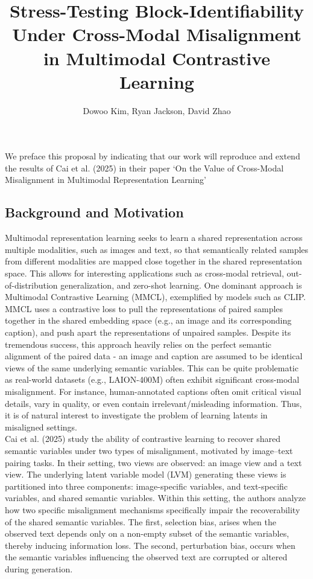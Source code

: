 \documentclass[a4paper,12pt]{article}
\title{Stress-Testing Block-Identifiability Under Cross-Modal Misalignment in Multimodal Contrastive Learning}
\author{Dowoo Kim, Ryan Jackson, David Zhao}
\begin{document}
\maketitle
We preface this proposal by indicating that our work will reproduce and extend the results of Cai et al. (2025) in their paper ‘On the Value of Cross-Modal Misalignment in Multimodal Representation Learning’ \cite{cai2025valuecrossmodalmisalignmentmultimodal}

\subsection*{Background and Motivation}

Multimodal representation learning seeks to learn a shared representation across multiple modalities, such as images and text, so that semantically related samples from different modalities are mapped close together in the shared representation space. This allows for interesting applications such as cross-modal retrieval, out-of-distribution generalization, and zero-shot learning. One dominant approach is Multimodal Contrastive Learning (MMCL), exemplified by models such as CLIP. MMCL uses a contrastive loss to pull the representations of paired samples together in the shared embedding space (e.g., an image and its corresponding caption), and push apart the representations of unpaired samples. Despite its tremendous success, this approach heavily relies on the perfect semantic alignment of the paired data - an image and caption are assumed to be identical views of the same underlying semantic variables. This can be quite problematic as real-world datasets (e.g., LAION-400M) often exhibit significant cross-modal misalignment. For instance, human-annotated captions often omit critical visual details, vary in quality, or even contain irrelevant/misleading information. Thus, it is of natural interest to investigate the problem of learning latents in misaligned settings. \\

Cai et al. (2025) study the ability of contrastive learning to recover shared semantic variables under two types of misalignment, motivated by image–text pairing tasks. In their setting, two views are observed: an image view and a text view. The underlying latent variable model (LVM) generating these views is partitioned into three components: image-specific variables, and text-specific variables, and shared semantic variables. Within this setting, the authors analyze how two specific misalignment mechanisms specifically impair the recoverability of the shared semantic variables. The first, selection bias, arises when the observed text depends only on a non-empty subset of the semantic variables, thereby inducing information loss. The second, perturbation bias, occurs when the semantic variables influencing the observed text are corrupted or altered during generation. \\
\end{document}
